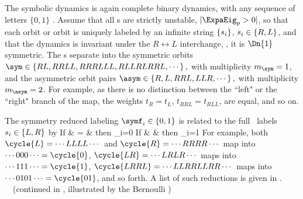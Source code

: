 {The symbolic dynamics is again complete binary dynamics, with any
sequence of letters $\{0,1\}$ \admissible.
Assume that all \po s are strictly unstable, $|\ExpaEig_p>0|$,  so that
each orbit or orbit is uniquely labeled by an infinite string
$\{{s_{i}}\}$, ${s_{i}}\in\{R,L\}$, and that the dynamics is invariant
under the $ R \leftrightarrow L $ interchange, \ie, it is $\Dn{1}$
symmetric. The \po s separate into the symmetric orbits
\(
\sym\in\{RL, RRLL, RRRLLL, RLLRLRRL, \cdots\}
\,,
\)
with multiplicity $m_\sym=1$, and the asymmetric orbit pairs
\(
\asym\in\{R, L, RRL, LLR, \cdots\}
\,,
\)
with multiplicity $m_\asym=2$. For example, as there is no
distinction between %
the ``left" or the ``right" branch of the map, the weights
$t_R=t_L$,  $t_{RRL}=t_{RLL}$, are equal, and so on.

The symmetry reduced labeling $\symf_i \in \{0,1\}$ is related to the full
\statesp\ labels ${s_{i}} \in \{L,R\}$ %
by
\bea
\mbox{If} \quad {} & = &  \quad \mbox{then} \quad \symf_i=0
     \continue
\mbox{If} \quad {} & \neq &  \quad \mbox{then} \quad \symf_i=1
\eea
For example, both $\cycle{L}=\cdots{LLLL}\cdots$ and
$\cycle{R}=\cdots{RRRR}\cdots$ map into $\cdots{000}\cdots=\cycle{0}$,
$\cycle{LR}=\cdots{LRLR}\cdots$ maps into $\cdots{111}\cdots=\cycle{1}$,
$\cycle{LRRL}=\cdots{LLRRLLRR}\cdots$
maps into $\cdots{0101}\cdots = \cycle{01}$, and so forth.
A list of such reductions is given in  .
%
~~(continued in ,
   illustrated by the Bernoulli )
    } %

\renewcommand{\Refl}{\ensuremath{{s}}} %

